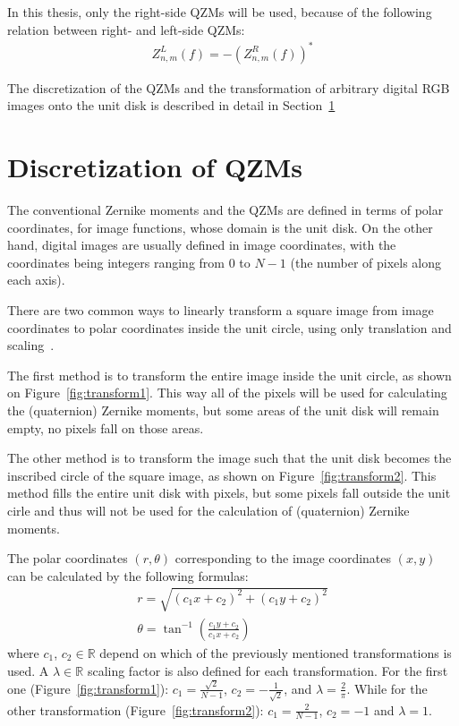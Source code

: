In this thesis, only the right-side QZMs will be used, because of the following relation between right- and left-side QZMs:
\begin{gather*}
  Z_{n,m}^L(f) = -(Z_{n,m}^R(f))^{*}
\end{gather*}

The discretization of the QZMs and the transformation of arbitrary digital RGB images onto the unit disk is described in detail in Section~\ref{sec:discretization} 

\section{Discretization of QZMs}\label{sec:discretization}
The conventional Zernike moments and the QZMs are defined in terms of polar coordinates, for image functions, whose domain is the unit disk. On the other hand, digital images are usually defined in image coordinates, with the coordinates being integers ranging from $0$ to $N - 1$ (the number of pixels along each axis).

There are two common ways to linearly transform a square image from image coordinates to polar coordinates inside the unit circle, using only translation and scaling~\cite{kintner}.

The first method is to transform the entire image inside the unit circle, as shown on Figure~\ref{fig:transform1}. This way all of the pixels will be used for calculating the (quaternion) Zernike moments, but some areas of the unit disk will remain empty, no pixels fall on those areas.

The other method is to transform the image such that the unit disk becomes the inscribed circle of the square image, as shown on Figure~\ref{fig:transform2}. This method fills the entire unit disk with pixels, but some pixels fall outside the unit cirle and thus will not be used for the calculation of (quaternion) Zernike moments.

The polar coordinates $(r,\theta)$ corresponding to the image coordinates $(x,y)$ can be calculated by the following formulas:
\begin{gather*}
  r = \sqrt{(c_1x + c_2)^2 + (c_1y + c_2)^2} \\
  \theta = \tan^{-1}\left(\frac{c_1y + c_2}{c_1x + c_2}\right)
\end{gather*}
where $c_1$, $c_2 \in \mathds{R}$ depend on which of the previously mentioned transformations is used. A $\lambda \in \mathds{R}$ scaling factor is also defined for each transformation.
For the first one (Figure~\ref{fig:transform1}): $c_1 = \frac{\sqrt{2}}{N - 1}$, $c_2 = -\frac{1}{\sqrt{2}}$, and $\lambda = \frac{2}{\pi}$. While for the other transformation (Figure~\ref{fig:transform2}): $c_1 = \frac{2}{N - 1}$, $c_2 = -1$ and $\lambda = 1$.


